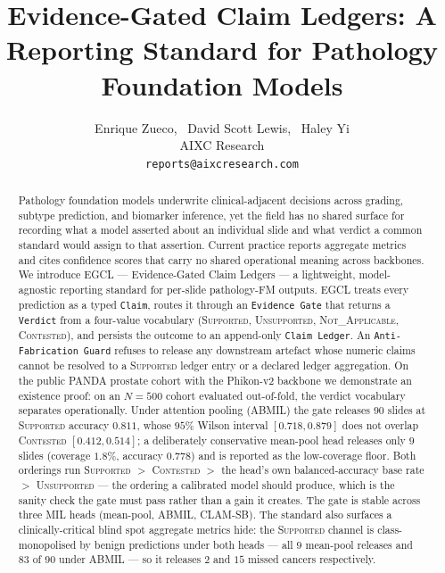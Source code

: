 \documentclass{article}
\title{Evidence-Gated Claim Ledgers: A Reporting Standard for Pathology Foundation Models}
\author{%
  Enrique Zueco, \ David Scott Lewis, \ Haley Yi\\
  AIXC Research\\
  \texttt{reports@aixcresearch.com}
}
\newcommand{\SafeNum}[1]{#1}
\begin{document}
\maketitle

\begin{abstract}
Pathology foundation models underwrite clinical-adjacent decisions across grading, subtype prediction, and biomarker inference, yet the field has no shared surface for recording what a model asserted about an individual slide and what verdict a common standard would assign to that assertion. Current practice reports aggregate metrics and cites confidence scores that carry no shared operational meaning across backbones. We introduce EGCL --- Evidence-Gated Claim Ledgers --- a lightweight, model-agnostic reporting standard for per-slide pathology-FM outputs. EGCL treats every prediction as a typed \texttt{Claim}, routes it through an \texttt{Evidence Gate} that returns a \texttt{Verdict} from a four-value vocabulary (\textsc{Supported}, \textsc{Unsupported}, \textsc{Not\_Applicable}, \textsc{Contested}), and persists the outcome to an append-only \texttt{Claim Ledger}. An \texttt{Anti-Fabrication Guard} refuses to release any downstream artefact whose numeric claims cannot be resolved to a \textsc{Supported} ledger entry or a declared ledger aggregation. On the public PANDA prostate cohort with the Phikon-v2 backbone we demonstrate an existence proof: on an $N{=}\SafeNum{500}$ cohort evaluated out-of-fold, the verdict vocabulary separates operationally. Under attention pooling (ABMIL) the gate releases $\SafeNum{90}$ slides at \textsc{Supported} accuracy $\SafeNum{0.811}$, whose $\SafeNum{95\%}$ Wilson interval $[\SafeNum{0.718}, \SafeNum{0.879}]$ does not overlap \textsc{Contested} $[\SafeNum{0.412}, \SafeNum{0.514}]$; a deliberately conservative mean-pool head releases only $\SafeNum{9}$ slides (coverage $\SafeNum{1.8}\%$, accuracy $\SafeNum{0.778}$) and is reported as the low-coverage floor. Both orderings run \textsc{Supported} $>$ \textsc{Contested} $>$ the head's own balanced-accuracy base rate $>$ \textsc{Unsupported} --- the ordering a calibrated model should produce, which is the sanity check the gate must pass rather than a gain it creates. The gate is stable across three MIL heads (mean-pool, ABMIL, CLAM-SB). The standard also surfaces a clinically-critical blind spot aggregate metrics hide: the \textsc{Supported} channel is class-monopolised by benign predictions under both heads --- all $\SafeNum{9}$ mean-pool releases and $\SafeNum{83}$ of $\SafeNum{90}$ under ABMIL --- so it releases $\SafeNum{2}$ and $\SafeNum{15}$ missed cancers respectively.
\end{abstract}
\end{document}
